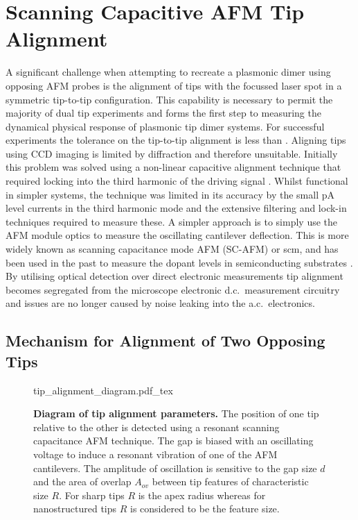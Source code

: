 \documentclass{article}
\begin{document}
\section{Scanning Capacitive AFM Tip Alignment}
\label{sec:tip_alignment}

A significant challenge when attempting to recreate a plasmonic dimer using opposing AFM probes is the alignment of tips with the focussed laser spot in a symmetric tip-to-tip configuration. This capability is necessary to permit the majority of dual tip experiments and forms the first step to measuring the dynamical physical response of plasmonic tip dimer systems. For successful experiments the tolerance on the tip-to-tip alignment is less than . Aligning tips using CCD imaging is limited by diffraction and therefore unsuitable. Initially this problem was solved using a non-linear capacitive alignment technique that required locking into the third harmonic of the driving signal \cite{savage2011}. Whilst functional in simpler systems, the technique was limited in its accuracy by the small pA level currents in the third harmonic mode and the extensive filtering and lock-in techniques required to measure these. A simpler approach is to simply use the AFM module optics to measure the oscillating cantilever deflection. This is more widely known as scanning capacitance mode AFM (SC-AFM) or \gls{scm}, and has been used in the past to measure the dopant levels in semiconducting substrates \cite{matey1985scanning, bugg1988scanning, huang1995quantitative, kopanski1996scanning, girard2001electrostatic}. By utilising optical detection over direct electronic measurements tip alignment becomes segregated from the microscope electronic d.c.\ measurement circuitry and issues are no longer caused by noise leaking into the a.c.\ electronics.

\subsection{Mechanism for Alignment of Two Opposing Tips}

\begin{figure}[bt]
\centering
\fontsize{10pt}{1em}\selectfont
\def\svgwidth{0.65\textwidth}
{tip_alignment_diagram.pdf_tex}
\caption[Diagram of tip alignment parameters]{\textbf{Diagram of tip alignment parameters.} The position of one tip relative to the other is detected using a resonant scanning capacitance AFM technique. The gap is biased with an oscillating voltage to induce a resonant vibration of one of the AFM cantilevers. The amplitude of oscillation is sensitive to the gap size $d$ and the area of overlap $A_{ov}$ between tip features of characteristic size $R$. For sharp tips $R$ is the apex radius whereas for nanostructured tips $R$ is considered to be the feature size.}
\label{fig:tip_alignment_diagram}
\end{figure}
\end{document}

